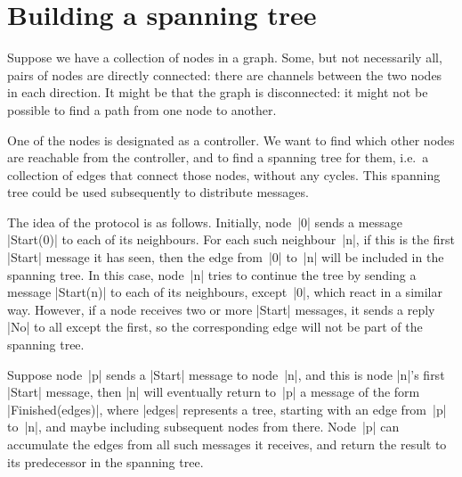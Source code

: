 \section{Building a spanning tree}

Suppose we have a collection of nodes in a graph.  Some, but not necessarily
all, pairs of nodes are directly connected: there are channels between the two
nodes in each direction.  It might be that the graph is disconnected: it might
not be possible to find a path from one node to another.  

One of the nodes is designated as a controller.  We want to find which other
nodes are reachable from the controller, and to find a spanning tree for them,
i.e.~a collection of edges that connect those nodes, without any cycles.  This
spanning tree could be used subsequently to distribute messages.

The idea of the protocol is as follows.  Initially, node~|0| sends a message
|Start(0)| to each of its neighbours.  For each such neighbour~|n|, if this is
the first |Start| message it has seen, then the edge from~|0| to~|n| will be
included in the spanning tree.  In this case, node~|n| tries to continue the
tree by sending a message |Start(n)| to each of its neighbours, except~|0|,
which react in a similar way.  However, if a node receives two or more |Start|
messages, it sends a reply |No| to all except the first, so the corresponding
edge will not be part of the spanning tree.  

Suppose node~|p| sends a |Start| message to node~|n|, and this is node |n|'s
first |Start| message, then |n| will eventually return to~|p| a message of the
form |Finished(edges)|, where |edges| represents a tree, starting with an edge
from~|p| to~|n|, and maybe including subsequent nodes from there.  Node~|p|
can accumulate the edges from all such messages it receives, and return the
result to its predecessor in the spanning tree. 


